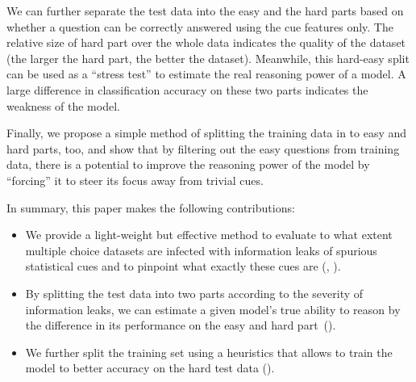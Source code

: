 We can further separate the test data into the easy and the hard parts 
based on whether a question can be correctly answered
using the cue features only. The relative size of hard part over the whole
data indicates the quality of the dataset (the larger the hard part, 
the better the dataset).
Meanwhile, this hard-easy split can be used as a ``stress test'' to
estimate the real reasoning power of a model. 
A large difference in classification accuracy on these two parts indicates
the weakness of the model.

Finally, we propose a simple method of splitting the training data 
in to easy and hard parts, too,
and show that by filtering out the easy questions from training data,
there is a potential to improve the reasoning power of the model by ``forcing'' it
to steer its focus away from trivial cues. 


In summary, this paper makes the following contributions:
\begin{itemize}
\item We provide a light-weight but effective method to evaluate to what extent 
multiple choice datasets are infected with information leaks of spurious statistical
cues and to pinpoint what exactly these cues are 
(, ).

\item By splitting the test data into two parts according to  
the severity of information leaks, 
we can estimate a given model's true ability to reason
by the difference in its performance on the easy and hard 
part~().

\item We further split the training set using a heuristics that allows to
train the model to better accuracy on the hard test data (). 
\end{itemize}

